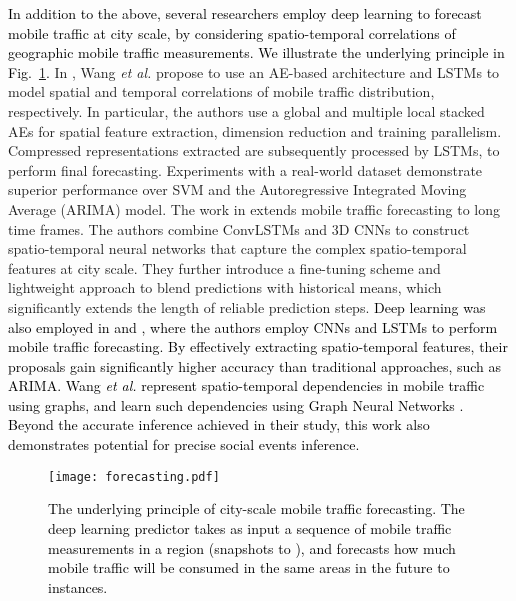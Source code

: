 \documentclass[journal,comsoc,letter]{IEEEtran}
\newcommand{\edit}[1]{\textcolor{black}{#1}}
\newcommand{\rev}[1]{\textcolor{black}{#1}}
\begin{document}
\rev{In addition to the above, several researchers employ deep learning to forecast mobile traffic at city scale, by considering spatio-temporal correlations of geographic mobile traffic measurements. We illustrate the underlying principle in Fig.~\ref{fig:forecasting}.} In \cite{wangspatiotemporal}, Wang \emph{et al.} propose to use an AE-based architecture and LSTMs to model spatial and temporal correlations of mobile traffic distribution, respectively. In particular, the authors use a global and multiple local stacked AEs for spatial feature extraction, dimension reduction and training parallelism. Compressed representations extracted are subsequently processed by LSTMs, to perform final forecasting. Experiments with a real-world dataset demonstrate superior performance over SVM and the Autoregressive Integrated Moving Average (ARIMA) model. The work in \cite{zhang2017long} extends mobile traffic forecasting to long time frames. The authors combine ConvLSTMs and 3D CNNs to construct spatio-temporal neural networks that capture the complex spatio-temporal features at city scale. They further introduce a fine-tuning scheme and lightweight approach to blend predictions with historical means, which significantly extends the length of reliable prediction steps. \edit{Deep learning was also employed in \cite{huang2017study, alawe2018improving, feng2018deeptp} and \cite{chen2018deep0}, where the authors employ CNNs and LSTMs to perform mobile traffic forecasting. By effectively extracting spatio-temporal features, their proposals gain significantly higher accuracy than traditional approaches, such as ARIMA.} \rev{Wang \emph{et al.} represent spatio-temporal dependencies in mobile traffic using graphs, and learn such dependencies using Graph Neural Networks \cite{wang2018spatio}. Beyond the accurate inference achieved in their study, this work also demonstrates potential for precise social events inference.}
\begin{figure}[htb]
\begin{center}
\texttt{[image: forecasting.pdf]}
\end{center}
\caption{\label{fig:forecasting} \rev{The underlying principle of city-scale mobile traffic forecasting. The deep learning predictor takes as input a sequence of mobile traffic measurements in a region (snapshots  to ), and forecasts how much mobile traffic will be consumed in the same areas in the future  to  instances.} }
\end{figure}
\end{document}

